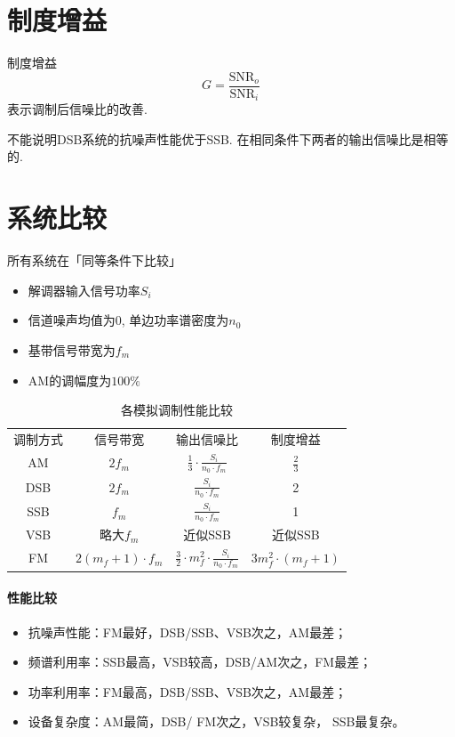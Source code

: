\documentclass[a4paper]{report}
\begin{document}
\section{制度增益}
制度增益\begin{equation}
  G=\frac{\text{SNR}_o}{\text{SNR}_i}
\end{equation}
表示调制后信噪比的改善. 

不能说明DSB系统的抗噪声性能优于SSB. 在相同条件下两者的输出信噪比是相等的. 
\section{系统比较}
所有系统在「同等条件下比较」
\begin{itemize}
  \item 解调器输入信号功率$S_i$
  \item 信道噪声均值为0, 单边功率谱密度为$n_0$
  \item 基带信号带宽为$f_m$
  \item AM的调幅度为$100\%$
\end{itemize}
\begin{table}[htbp]
  \centering
    \begin{tabular}{|c|ccc|}
    \toprule
    调制方式  & 信号带宽  & 输出信噪比 & 制度增益 \\
    AM    &   $2f_m$    &  $\frac{1}{3}\cdot \frac{S_i}{n_0\cdot f_m}$     & $\frac{2}{3}$ \\
    DSB   &    $2f_m$   &   $\frac{S_i}{n_0\cdot f_m}$    & 2 \\
    SSB   &     $f_m$  &    $\frac{S_i}{n_0\cdot f_m}$   & 1 \\
    VSB   &     略大$f_m$  &  近似SSB     & 近似SSB \\
    FM    &    $2(m_f+1)\cdot f_m$   &   $\frac{3}{2}\cdot m_f^2\cdot \frac{S_i}{n_0\cdot f_m}$    & $3m_f^2\cdot (m_f+1)$ \\
    \bottomrule
    \end{tabular}%
  \caption{各模拟调制性能比较}
\end{table}%
\paragraph{性能比较}
\begin{itemize}
  \item 抗噪声性能：FM最好，DSB/SSB、VSB次之，AM最差；
  \item 频谱利用率：SSB最高，VSB较高，DSB/AM次之，FM最差；
  \item 功率利用率：FM最高，DSB/SSB、VSB次之，AM最差；
  \item 设备复杂度：AM最简，DSB/ FM次之，VSB较复杂， SSB最复杂。
\end{itemize}
\end{document}
